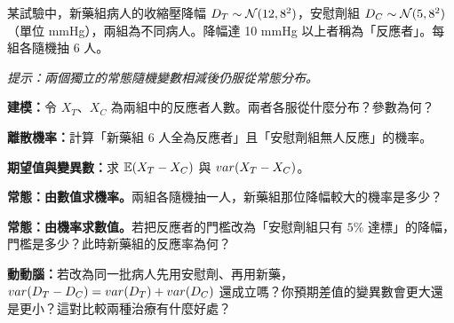 \members
\begin{scenario}
    某試驗中，新藥組病人的收縮壓降幅 $D_T \sim \mathcal{N}(12, 8^2)$，安慰劑組 $D_C \sim \mathcal{N}(5, 8^2)$（單位 mmHg），兩組為不同病人。降幅達 10 mmHg 以上者稱為「反應者」。每組各隨機抽 6 人。

    \smallskip
    \textit{提示：兩個獨立的常態隨機變數相減後仍服從常態分布。}
\end{scenario}
\begin{questions}
    \item \textbf{建模：}令 $X_T$、$X_C$ 為兩組中的反應者人數。兩者各服從什麼分布？參數為何？ \blank
    \item \textbf{離散機率：}計算「新藥組 6 人全為反應者」且「安慰劑組無人反應」的機率。 \blank
    \item \textbf{期望值與變異數：}求 $\mathbb{E}(X_T - X_C)$ 與 $var(X_T - X_C)$。 \blank
    \item \textbf{常態：由數值求機率。}兩組各隨機抽一人，新藥組那位降幅較大的機率是多少？ \blank
    \item \textbf{常態：由機率求數值。}若把反應者的門檻改為「安慰劑組只有 $5\%$ 達標」的降幅，門檻是多少？此時新藥組的反應率為何？ \blank
    \item \textbf{動動腦：}若改為同一批病人先用安慰劑、再用新藥，$var(D_T - D_C) = var(D_T)+var(D_C)$ 還成立嗎？你預期差值的變異數會更大還是更小？這對比較兩種治療有什麼好處？ \blank
\end{questions}


